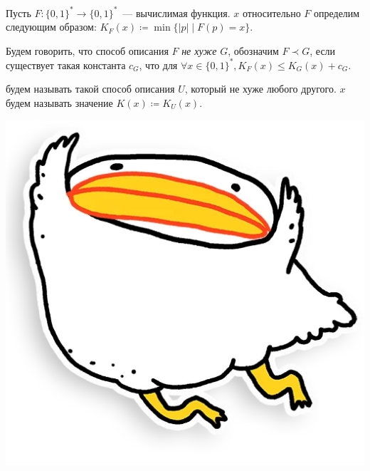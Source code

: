








\begin{definition*}
    Пусть $F\colon \{0, 1\}^* \to \{0, 1\}^*$~--- вычислимая функция.  $x$
    относительно $F$ определим следующим образом: $K_F(x) \coloneqq \min\{|p| \mid F(p) = x\}$.

    Будем говорить, что способ описания $F$ \textit{не хуже} $G$, обозначим $F \prec G$, если существует
    такая константа $c_G$, что для $\forall x \in \{0, 1\}^*, K_F(x) \le K_G(x) +
    c_G$.

     будем называть такой способ описания $U$, который не хуже любого
    другого.  $x$ будем называть значение $K(x) \coloneqq K_U(x)$.
\end{definition*}





\vspace{0.2cm}
\begin{center}
    \includegraphics[scale = 0.2]{../pics/utia-fly.png}    
\end{center}






